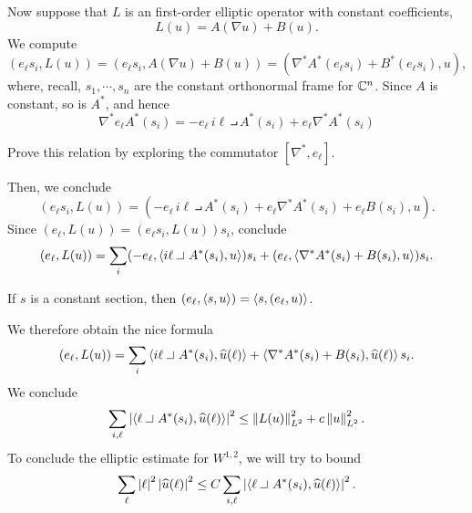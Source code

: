   Now suppose that $L$ is an first-order elliptic operator with constant coefficients,
  \begin{equation*}
    L(u)=A(\nabla u)+B(u).
  \end{equation*}
  We compute
  \begin{equation*}
    (e_{\ell} s_{i},L(u))=(e_{\ell} s_{i},A(\nabla u)+B(u))=(\nabla^{*}A^{*}(e_{\ell} s_{i})+B^{*}(e_{\ell} s_{i}),u),
  \end{equation*}
  where, recall, $s_{1},\cdots,s_{n}$ are the constant orthonormal frame for $\mathbb{C}^{n}$. Since $A$ is constant, so is $A^{*}$, and hence
  \begin{equation*}
    \nabla^{*}e_{\ell} A^{*}(s_{i})=-e_{\ell}\,i\ell\intprod A^{*}(s_{i})+e_{\ell} \nabla^{*}A^{*}(s_{i})
  \end{equation*}
  \begin{xca}
    Prove this relation by exploring the commutator $[\nabla^{*},e_{\ell}]$.
  \end{xca}
  Then, we conclude
  \begin{equation*}
    (e_{\ell} s_{i},L(u))=(-e_{\ell}\,i\ell\intprod A^{*}(s_{i})+e_{\ell} \nabla^{*}A^{*}(s_{i})+e_{\ell}B(s_{i}),u).
  \end{equation*}
  Since $(e_{\ell},L(u))=(e_{\ell}s_{i},L(u))s_{i}$, conclude
  \begin{equation*}
    (e_{\ell},L(u))=\sum_{i}(-e_{\ell},\ip{i\ell\intprod A^{*}(s_{i}),u})s_{i}+(e_{\ell},\ip{\nabla^{*}A^{*}(s_{i})+B(s_{i}),u})s_{i}.
  \end{equation*}
  \begin{xca}
    If $s$ is a constant section, then $(e_{\ell},\left\langle s,u\right\rangle)=\left\langle s,(e_{\ell},u)\right\rangle$.
  \end{xca}
  We therefore obtain the nice formula
  \begin{equation*}
    (e_{\ell},L(u))=\sum_{i}\ip{i\ell\intprod A^{*}(s_{i}),\hat{u}(\ell)}+\ip{\nabla^{*}A^{*}(s_{i})+B(s_{i}),\hat{u}(\ell)}s_{i}.
  \end{equation*}
  We conclude
  \begin{equation*}
    \sum_{i,\ell}\abs{\ip{\ell\intprod A^{*}(s_{i}),\hat{u}(\ell)}}^{2}\le \norm{L(u)}_{L^{2}}^{2}+c\norm{u}_{L^{2}}^{2}.
  \end{equation*}
  To conclude the elliptic estimate for $W^{1,2}$, we will try to bound
  \begin{equation*}
    \sum_{\ell}\abs{\ell}^{2}\abs{\hat{u}(\ell)}^{2}\le C \sum_{i,\ell}\abs{\ip{\ell\intprod A^{*}(s_{i}),\hat{u}(\ell)}}^{2}.
  \end{equation*}
